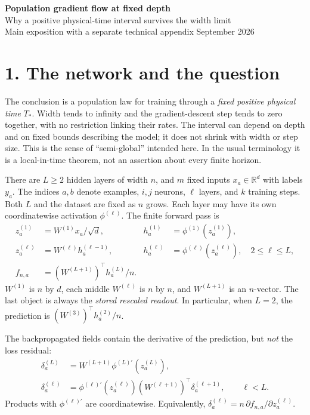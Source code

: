 \begin{center}
{\LARGE\bfseries Population gradient flow at fixed depth}\\[5pt]
{\large Why a positive physical-time interval survives the width limit}\\[7pt]
{\small Main exposition with a separate technical appendix \quad\textbullet{} September 2026}
\end{center}

\section*{1. The network and the question}

The conclusion is a population law for training through a \emph{fixed positive
physical time} $T_*$. Width tends to infinity and the gradient-descent step
tends to zero together, with no restriction linking their rates. The interval
can depend on depth and on fixed bounds describing the model; it does not
shrink with width or step size. This is the sense of ``semi-global'' intended
here. In the usual terminology it is a local-in-time theorem, not an assertion
about every finite horizon.

There are $L\ge2$ hidden layers of width $n$, and $m$ fixed inputs
$x_a\in\mathbb R^d$ with labels $y_a$. The indices $a,b$ denote examples,
$i,j$ neurons, $\ell$ layers, and $k$ training steps. Both $L$ and the dataset
are fixed as $n$ grows. Each layer may have its own coordinatewise activation
$\phi^{(\ell)}$. The finite forward pass is
\[
\begin{aligned}
z_a^{(1)}&=W^{(1)}x_a/\sqrt d,
&h_a^{(1)}&=\phi^{(1)}(z_a^{(1)}),\\
z_a^{(\ell)}&=W^{(\ell)}h_a^{(\ell-1)},
&h_a^{(\ell)}&=\phi^{(\ell)}(z_a^{(\ell)}),\quad 2\le\ell\le L,\\
f_{n,a}&=(W^{(L+1)})^\top h_a^{(L)}/n.
\end{aligned}
\]
$W^{(1)}$ is $n$ by $d$, each middle $W^{(\ell)}$ is $n$ by $n$, and
$W^{(L+1)}$ is an $n$-vector. The last object is always the \emph{stored
rescaled readout}. In particular, when $L=2$, the prediction is
$(W^{(3)})^\top h_a^{(2)}/n$.

The backpropagated fields contain the derivative of the prediction, but
\emph{not} the loss residual:
\[
\begin{aligned}
\delta_a^{(L)}&=W^{(L+1)}\phi^{(L)\prime}(z_a^{(L)}),\\
\delta_a^{(\ell)}&=\phi^{(\ell)\prime}(z_a^{(\ell)})
       (W^{(\ell+1)})^\top\delta_a^{(\ell+1)},\qquad \ell<L.
\end{aligned}
\]
Products with $\phi^{(\ell)\prime}$ are coordinatewise. Equivalently,
$\delta_a^{(\ell)}=n\,\partial f_{n,a}/\partial z_a^{(\ell)}$.

